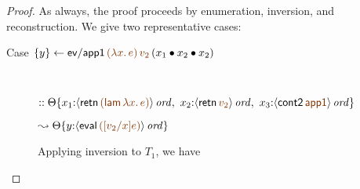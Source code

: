 \begin{proof} As always, the proof proceeds by enumeration, inversion,
  and reconstruction. We give two representative cases: 

\begin{description}

\item 
  [Case $\trstep{y}{{\sf ev/app1}\,\lf{(\lambda x.\,e)}\,\lf{v_2}\,(\tfuser{x_1}{\tfuser{x_2}{x_2}})}$]~

\qquad
  $::
   \tackon{\Theta}{x_1{:}\istrue{\susp{{\sf retn}\,\lf{({\sf lam}\,\lambda x.\,e)}}}, ~
                   x_2{:}\istrue{\susp{{\sf retn}\,\lf{v_2}}}, ~
                   x_3{:}\istrue{\susp{{\sf cont2}\,\lf{\sf app1}}}}$

\qquad\qquad
  $\leadsto
   \tackon{\Theta}{y{:}\istrue{\susp{{\sf eval}\,\lf{([v_2/x]e)}}}}$

\medskip
Applying inversion to $T_1$, we have


\end{description}
\end{proof}
